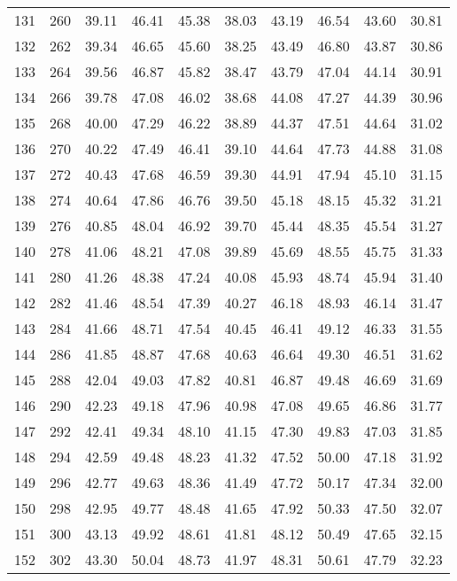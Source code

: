 \begin{longtable}{rrllllllll}
		131 & 260 & 39.11 & 46.41 & 45.38 & 38.03 & 43.19 & 46.54 & 43.60 & 30.81 \\ 
		132 & 262 & 39.34 & 46.65 & 45.60 & 38.25 & 43.49 & 46.80 & 43.87 & 30.86 \\ 
		133 & 264 & 39.56 & 46.87 & 45.82 & 38.47 & 43.79 & 47.04 & 44.14 & 30.91 \\ 
		134 & 266 & 39.78 & 47.08 & 46.02 & 38.68 & 44.08 & 47.27 & 44.39 & 30.96 \\ 
		135 & 268 & 40.00 & 47.29 & 46.22 & 38.89 & 44.37 & 47.51 & 44.64 & 31.02 \\ 
		136 & 270 & 40.22 & 47.49 & 46.41 & 39.10 & 44.64 & 47.73 & 44.88 & 31.08 \\ 
		137 & 272 & 40.43 & 47.68 & 46.59 & 39.30 & 44.91 & 47.94 & 45.10 & 31.15 \\ 
		138 & 274 & 40.64 & 47.86 & 46.76 & 39.50 & 45.18 & 48.15 & 45.32 & 31.21 \\ 
		139 & 276 & 40.85 & 48.04 & 46.92 & 39.70 & 45.44 & 48.35 & 45.54 & 31.27 \\ 
		140 & 278 & 41.06 & 48.21 & 47.08 & 39.89 & 45.69 & 48.55 & 45.75 & 31.33 \\ 
		141 & 280 & 41.26 & 48.38 & 47.24 & 40.08 & 45.93 & 48.74 & 45.94 & 31.40 \\ 
		142 & 282 & 41.46 & 48.54 & 47.39 & 40.27 & 46.18 & 48.93 & 46.14 & 31.47 \\ 
		143 & 284 & 41.66 & 48.71 & 47.54 & 40.45 & 46.41 & 49.12 & 46.33 & 31.55 \\ 
		144 & 286 & 41.85 & 48.87 & 47.68 & 40.63 & 46.64 & 49.30 & 46.51 & 31.62 \\ 
		145 & 288 & 42.04 & 49.03 & 47.82 & 40.81 & 46.87 & 49.48 & 46.69 & 31.69 \\ 
		146 & 290 & 42.23 & 49.18 & 47.96 & 40.98 & 47.08 & 49.65 & 46.86 & 31.77 \\ 
		147 & 292 & 42.41 & 49.34 & 48.10 & 41.15 & 47.30 & 49.83 & 47.03 & 31.85 \\ 
		148 & 294 & 42.59 & 49.48 & 48.23 & 41.32 & 47.52 & 50.00 & 47.18 & 31.92 \\ 
		149 & 296 & 42.77 & 49.63 & 48.36 & 41.49 & 47.72 & 50.17 & 47.34 & 32.00 \\ 
		150 & 298 & 42.95 & 49.77 & 48.48 & 41.65 & 47.92 & 50.33 & 47.50 & 32.07 \\ 
		151 & 300 & 43.13 & 49.92 & 48.61 & 41.81 & 48.12 & 50.49 & 47.65 & 32.15 \\ 
		152 & 302 & 43.30 & 50.04 & 48.73 & 41.97 & 48.31 & 50.61 & 47.79 & 32.23 \\ 

\end{longtable}
